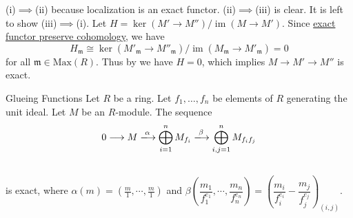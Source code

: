 \begin{prf}
    (i)$\implies$(ii) because localization is an exact functor. (ii)$\implies$(iii) is clear. It is left to show (iii)$\implies$(i). Let $H=\ker\left(M'\to M''\right)/\operatorname{im}\left(M\to M'\right)$. Since \hyperref[th:exact_functor_preserve_cohomology]{exact functor preserve cohomology}, we have 
    $$
    H_{\mathfrak{m}}\cong\ker \left(M'_{\mathfrak{m}}\to M''_{\mathfrak{m}}\right)/\operatorname{im}\left(M_{\mathfrak{m}}\to M'_{\mathfrak{m}}\right)=0
    $$ 
    for all $\mathfrak{m}\in \mathrm{Max}\left(R\right)$. Thus by  we have $H=0$, which implies $M\to M'\to M''$ is exact.
\end{prf}


\begin{proposition}{Glueing Functions}{}
    Let $R$ be a ring. Let $f_1, \ldots, f_n$ be elements of $R$ generating the unit ideal. Let $M$ be an $R$-module. The sequence
$$
\begin{aligned}
& 0 \longrightarrow M \xlongrightarrow{\alpha} \bigoplus_{i=1}^n M_{f_i} \xlongrightarrow{\beta} \bigoplus_{i, j=1}^n M_{f_i f_j} \\
& 
\end{aligned}
$$
is exact, where $\alpha(m)=\left(\frac{m}{1}, \cdots, \frac{m}{1}\right)$ and $\beta\left(\dfrac{m_1}{f_1^{e_1}}, \cdots, \dfrac{m_n}{f_n^{e_n}}\right)=\left(\dfrac{m_i}{f_i^{e_i}}-\dfrac{m_j}{f_j^{e_j}}\right)_{(i, j)}$.
\end{proposition}

